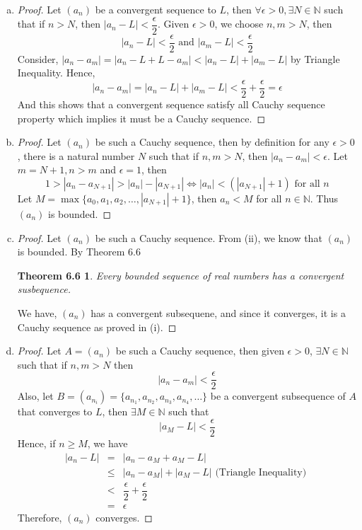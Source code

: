 \documentclass[10pt,letterpaper]{article}
\begin{document}
	\begin{enumerate}[(a)]
		\item 
		\begin{proof}
			Let $(a_n)$ be a convergent sequence to $L$, then $\forall \epsilon > 0, \exists N \in \mathbb{N}$ 
			such that if $n > N$, then $|a_n - L| < \dfrac{\epsilon}{2}$. 
			Given $\epsilon > 0$, we choose $n, m > N$, then 
			$$|a_n - L| < \dfrac{\epsilon}{2} \text{ and } 
			|a_m - L| < \dfrac{\epsilon}{2}$$
			Consider, $|a_n - a_m| = |a_{n} - L + L - a_{m}|
			< |a_{n} - L| + |a_{m} - L|$ by Triangle Inequality. Hence,
			$$|a_{n} - a_{m}| = |a_{n} - L| + |a_{m} - L| < \dfrac{\epsilon}{2} + \dfrac{\epsilon}{2} = \epsilon$$ 
			And this shows that a convergent sequence satisfy all Cauchy sequence property which implies
			it must be a Cauchy sequence.
		\end{proof}
		
		\item 
		\begin{proof}
			Let $(a_n)$ be such a Cauchy sequence, then by definition for any $\epsilon > 0$, there is a natural number $N$ such that if $n, m > N$, then $|a_n - a_m| < \epsilon$. Let $m = N + 1, n > m$ and $\epsilon = 1$, then
			$$1 > |a_n - a_{N+1}| > |a_n| - |a_{N+1}| \Leftrightarrow
			|a_n| < (|a_{N+1}| + 1) \text{ for all } n$$
			Let $M = \max\{a_0, a_1, a_2, \ldots, |a_{N+1}| + 1\}$, then $a_n < M$ for all $n \in \mathbb{N}$.
			Thus $(a_n)$ is bounded.
		\end{proof}
		
		\item 
		\begin{proof}
		Let $(a_n)$ be such a Cauchy sequence. From (ii), we know that $(a_n)$ is bounded. By Theorem
		6.6 
		\newtheorem*{tm1}{Theorem 6.6}
		\begin{tm1}
			Every bounded sequence of real numbers has a convergent susbequence.
		\end{tm1}
		We have, $(a_n)$ has a convergent subsequene, and since it converges, it is a Cauchy sequence
		as proved in (i).		
		\end{proof}
		
		\item
		\begin{proof} 
		Let $A = (a_n)$ be such a Cauchy sequence, then given $\epsilon > 0$, $\exists N \in \mathbb{N}$ 
		such that if $n, m > N$ then 
		$$|a_n - a_m| < \dfrac{\epsilon}{2}$$
		Also, let $B = (a_{n_i}) = \{a_{n_1}, a_{n_2}, a_{n_3}, a_{n_4}, \ldots\}$ 
		be a convergent subsequence of $A$ that converges to $L$, then $\exists
	 	M \in \mathbb{N}$ such that 
	 	$$|a_M - L| < \dfrac{\epsilon}{2}$$
	 	Hence, if $n \geq M$, we have
	 	\begin{eqnarray*}
	 		|a_n - L| &=& |a_n - a_M + a_M - L| \\
	 		& \leq & |a_n - a_M| + |a_M - L| \text{ (Triangle Inequality) }\\
	 		& < & \dfrac{\epsilon}{2} + \dfrac{\epsilon}{2} \\
	 		& = & \epsilon
	 	\end{eqnarray*}
	 	Therefore, $(a_n)$ converges.
		\end{proof}					
	\end{enumerate}
	
\end{document}
